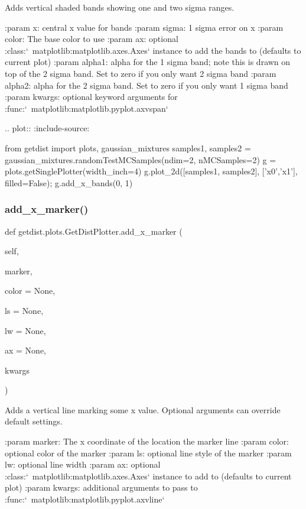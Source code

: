 \begin{DoxyVerb}Adds vertical shaded bands showing one and two sigma ranges.

:param x: central x value for bands
:param sigma: 1 sigma error on x
:param color: The base color to use
:param ax: optional :class:`~matplotlib:matplotlib.axes.Axes` instance to add the bands to (defaults to current plot)
:param alpha1: alpha for the 1 sigma band; note this is drawn on top of the 2 sigma band. Set to zero if you only want 2 sigma band
:param alpha2: alpha for the 2 sigma band. Set to zero if you only want 1 sigma band
:param kwargs: optional keyword arguments for :func:`~matplotlib:matplotlib.pyplot.axvspan`

.. plot::
   :include-source:
   
    from getdist import plots, gaussian_mixtures
    samples1, samples2 = gaussian_mixtures.randomTestMCSamples(ndim=2, nMCSamples=2)
    g = plots.getSinglePlotter(width_inch=4)
    g.plot_2d([samples1, samples2], ['x0','x1'], filled=False);
    g.add_x_bands(0, 1)
\end{DoxyVerb}
 \mbox{\label{classgetdist_1_1plots_1_1GetDistPlotter_a91bd8b0085aa1366a6cb6e8d329da5c4}} 
\subsubsection{\texorpdfstring{add\+\_\+x\+\_\+marker()}{add\_x\_marker()}}
{\footnotesize\ttfamily def getdist.\+plots.\+Get\+Dist\+Plotter.\+add\+\_\+x\+\_\+marker (\begin{DoxyParamCaption}\item[{}]{self,  }\item[{}]{marker,  }\item[{}]{color = {\ttfamily None},  }\item[{}]{ls = {\ttfamily None},  }\item[{}]{lw = {\ttfamily None},  }\item[{}]{ax = {\ttfamily None},  }\item[{}]{kwargs }\end{DoxyParamCaption})}

\begin{DoxyVerb}Adds a vertical line marking some x value. Optional arguments can override default settings.

:param marker: The x coordinate of the location the marker line
:param color: optional color of the marker
:param ls: optional line style of the marker
:param lw: optional line width
:param ax: optional :class:`~matplotlib:matplotlib.axes.Axes` instance to add to (defaults to current plot)
:param kwargs: additional arguments to pass to :func:`~matplotlib:matplotlib.pyplot.axvline`
\end{DoxyVerb}
 

